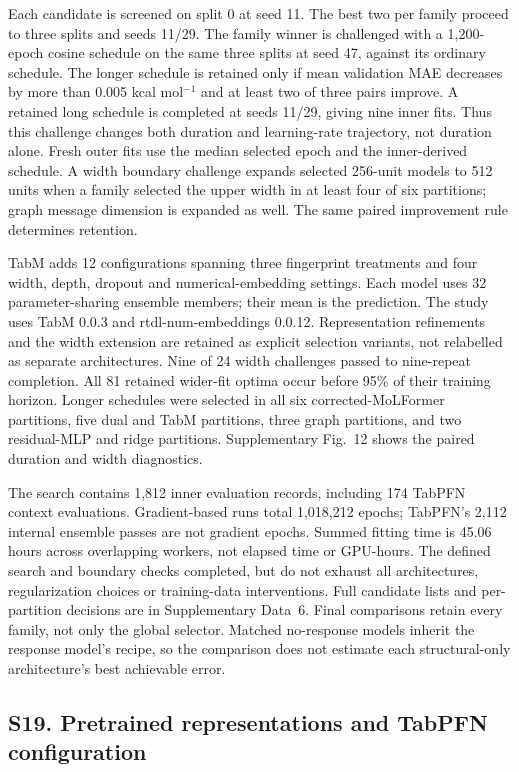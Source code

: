 Each candidate is screened on split 0 at seed 11. The best two per family proceed
to three splits and seeds 11/29. The family winner is challenged with a 1,200-epoch
cosine schedule on the same three splits at seed 47, against its ordinary schedule.
The longer schedule is retained only if mean validation MAE decreases by more than
0.005 kcal mol$^{-1}$ and at least two of three pairs improve. A retained long
schedule is completed at seeds 11/29, giving nine inner fits. Thus this challenge
changes both duration and learning-rate trajectory, not duration alone. Fresh
outer fits use the median selected epoch and the inner-derived schedule. A width
boundary challenge expands selected 256-unit models to 512 units when a family
selected the upper width in at least four of six partitions; graph message dimension
is expanded as well. The same paired improvement rule determines retention.

TabM adds 12 configurations spanning three fingerprint treatments and four width,
depth, dropout and numerical-embedding settings. Each model uses 32 parameter-sharing
ensemble members; their mean is the prediction.\cite{tabm2025} The study uses TabM
0.0.3 and rtdl-num-embeddings 0.0.12. Representation refinements and the width
extension are retained as explicit selection variants, not relabelled as separate
architectures. Nine of 24 width challenges passed to nine-repeat completion.
All 81 retained wider-fit optima occur before 95\% of their training horizon.
Longer schedules were selected in all six corrected-MoLFormer partitions, five
dual and TabM partitions, three graph partitions, and two residual-MLP and ridge
partitions. Supplementary Fig.~12 shows the paired duration and width diagnostics.

The search contains 1,812 inner evaluation records, including 174 TabPFN context
evaluations. Gradient-based runs total 1,018,212 epochs; TabPFN's 2,112 internal
ensemble passes are not gradient epochs. Summed fitting time is 45.06 hours across
overlapping workers, not elapsed time or GPU-hours. The defined search and boundary
checks completed, but do not exhaust all architectures, regularization choices or
training-data interventions. Full candidate lists and per-partition decisions are
in Supplementary Data~6. Final comparisons retain every family, not only the global
selector. Matched no-response models inherit the response model's recipe, so the
comparison does not estimate each structural-only architecture's best achievable error.

\subsection*{S19. Pretrained representations and TabPFN configuration}

